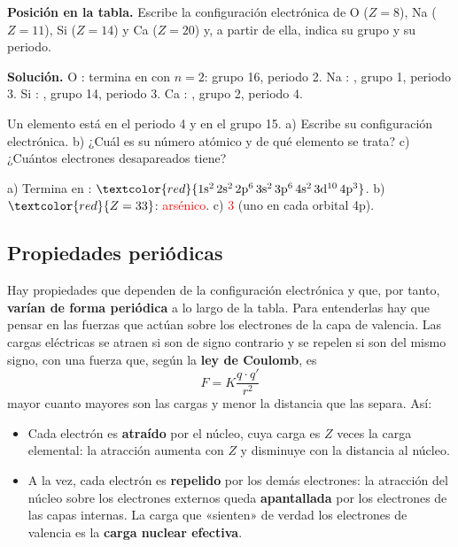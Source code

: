 \begin{example}
    \textbf{Posición en la tabla.} Escribe la configuración electrónica de O (\(Z = 8\)), Na (\(Z = 11\)), Si (\(Z = 14\)) y
    Ca (\(Z = 20\)) y, a partir de ella, indica su grupo y su periodo.

    \textbf{Solución.} O : termina en  con \(n = 2\): grupo 16, periodo 2.
    Na : , grupo 1, periodo 3. Si : ,
    grupo 14, periodo 3. Ca : , grupo 2, periodo 4.
\end{example}

\begin{exercise}
    Un elemento está en el periodo 4 y en el grupo 15. a) Escribe su configuración electrónica. b) ¿Cuál es su número atómico y de
    qué elemento se trata? c) ¿Cuántos electrones desapareados tiene?
    \begin{solu}
        a) Termina en : \(\textcolor{red}{\conf{1s^2\,2s^2\,2p^6\,3s^2\,3p^6\,4s^2\,3d^{10}\,4p^3}}\).
        b) \(\textcolor{red}{Z = 33}\): \textcolor{red}{arsénico}. c) \textcolor{red}{3} (uno en cada orbital 4p).
    \end{solu}
\end{exercise}

\subsection{Propiedades periódicas}

Hay propiedades que dependen de la configuración electrónica y que, por tanto, \textbf{varían de forma periódica} a lo largo de
la tabla. Para entenderlas hay que pensar en las fuerzas que actúan sobre los electrones de la capa de valencia. Las cargas
eléctricas se atraen si son de signo contrario y se repelen si son del mismo signo, con una fuerza que, según la
\textbf{ley de Coulomb}, es
\[ F = K \frac{q \cdot q'}{r^2} \]
mayor cuanto mayores son las cargas y menor la distancia que las separa. Así:
\begin{itemize}
    \item Cada electrón es \textbf{atraído} por el núcleo, cuya carga es \(Z\) veces la carga elemental: la atracción aumenta con
    \(Z\) y disminuye con la distancia al núcleo.
    \item A la vez, cada electrón es \textbf{repelido} por los demás electrones: la atracción del núcleo sobre los electrones
    externos queda \textbf{apantallada} por los electrones de las capas internas. La carga que «sienten» de verdad los
    electrones de valencia es la \textbf{carga nuclear efectiva}.
\end{itemize}

